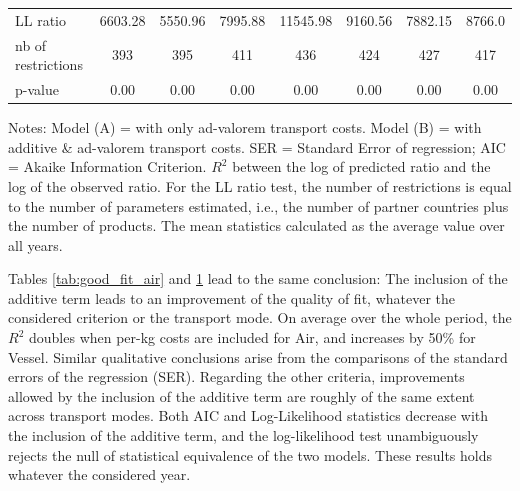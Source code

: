 \documentclass[a4paper,11pt]{article}
\begin{document}
\begin{table}[htbp]
{\begin{center}
\begin{tabular}{l|cccccc|c}
    LL ratio & \multicolumn{1}{c}{6603.28} & \multicolumn{1}{c}{5550.96} & \multicolumn{1}{c}{7995.88} & \multicolumn{1}{c}{11545.98} & 9160.56 & \multicolumn{1}{c}{7882.15} & 8766.0 \\
    nb of restrictions & \multicolumn{1}{c}{393} & \multicolumn{1}{c}{395} & \multicolumn{1}{c}{411} & \multicolumn{1}{c}{436} & 424   & \multicolumn{1}{c}{427} & 417 \\
    p-value& \multicolumn{1}{c}{0.00} & \multicolumn{1}{c}{0.00} & \multicolumn{1}{c}{0.00} & \multicolumn{1}{c}{0.00} & 0.00  & \multicolumn{1}{c}{0.00} & 0.00 \\
    \hline \hline
    \end{tabular}%
    \end{center}}
  \label{tab:good_fit_vessel}%
  \parbox[l]{12cm}{\tiny{Notes: Model (A) = with only ad-valorem transport costs.
Model (B) = with additive \& ad-valorem transport costs.
SER = Standard Error of regression; AIC = Akaike Information Criterion.
$R^{2}$ between the log of predicted ratio and the log of the observed ratio.
For the LL ratio test, the number of restrictions is equal to the number of parameters estimated, i.e., the number of partner countries plus the number of products.
The mean statistics calculated as the average value over all years.
}}
\end{table}%


Tables \ref{tab:good_fit_air} and \ref{tab:good_fit_vessel} lead to the same conclusion: The inclusion of the additive term leads to an improvement of the quality of fit, whatever the considered criterion or the transport mode.
On average over the whole period, the $R^{2}$ doubles when per-kg costs are included for Air, and increases by 50\% for Vessel.
Similar qualitative conclusions arise from the comparisons of the standard errors of the regression (SER).
Regarding the other criteria, improvements allowed by the inclusion of the additive term are roughly of the same extent across transport modes.
Both AIC and Log-Likelihood statistics decrease with the inclusion of the additive term, and the log-likelihood test unambiguously rejects the null of statistical equivalence of the two models.
These results holds whatever the considered year.\smallskip
\end{document}
